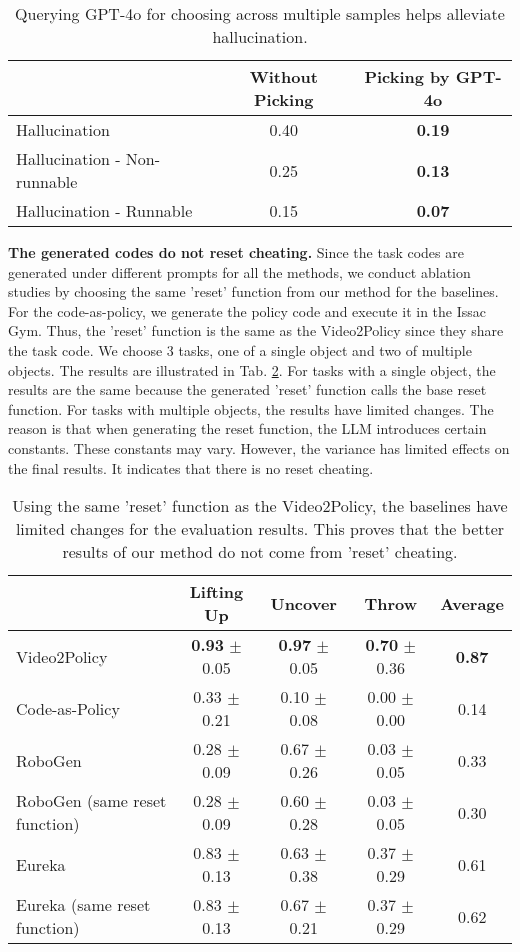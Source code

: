 \begin{table}[!h]
    \centering
    \caption{\label{tab:hallucination} Querying GPT-4o for choosing across multiple samples helps alleviate hallucination.} 
    \begin{tabular}{l|cc}
        \toprule
         & Without Picking & Picking by GPT-4o \\
        \midrule
        Hallucination & 0.40 & \textbf{0.19} \\
        \midrule
        Hallucination - Non-runnable & 0.25 & \textbf{0.13} \\
        Hallucination - Runnable & 0.15 & \textbf{0.07} \\
        \bottomrule
    \end{tabular}
\end{table}

\textbf{The generated codes do not reset cheating.} Since the task codes are generated under different prompts for all the methods, we conduct ablation studies by choosing the same 'reset' function from our method for the baselines. For the code-as-policy, we generate the policy code and execute it in the Issac Gym. Thus, the 'reset' function is the same as the Video2Policy since they share the task code. We choose 3 tasks, one of a single object and two of multiple objects. The results are illustrated in Tab. \ref{tab:ablation_reset}. For tasks with a single object, the results are the same because the generated 'reset' function calls the base reset function. For tasks with multiple objects, the results have limited changes. The reason is that when generating the reset function, the LLM introduces certain constants. These constants may vary.
However, the variance has limited effects on the final results. It indicates that there is no reset cheating.

\begin{table}[!h]
    \centering
    \caption{\label{tab:ablation_reset} Using the same 'reset' function as the Video2Policy, the baselines have limited changes for the evaluation results. This proves that the better results of our method do not come from 'reset' cheating.} 
    \begin{tabular}{l|ccc|c}
        \toprule
         & Lifting Up & Uncover & Throw & Average \\
        \midrule
        Video2Policy & \textbf{0.93} $\pm$ 0.05 & \textbf{0.97} $\pm$ 0.05 & \textbf{0.70} $\pm$ 0.36 & \textbf{0.87} \\
        Code-as-Policy & 0.33 $\pm$ 0.21 & 0.10 $\pm$ 0.08 & 0.00 $\pm$ 0.00 & 0.14 \\
        \midrule
        RoboGen & 0.28 $\pm$ 0.09 & 0.67 $\pm$ 0.26 & 0.03 $\pm$ 0.05 & 0.33 \\
        RoboGen (same reset function) & 0.28 $\pm$ 0.09 & 0.60 $\pm$ 0.28 & 0.03 $\pm$ 0.05 & 0.30 \\
        \midrule
        Eureka & 0.83 $\pm$ 0.13 & 0.63 $\pm$ 0.38 & 0.37 $\pm$ 0.29 & 0.61 \\
        Eureka (same reset function) & 0.83 $\pm$ 0.13 & 0.67 $\pm$ 0.21 & 0.37 $\pm$ 0.29 & 0.62 \\
        \bottomrule
    \end{tabular}
\end{table}
